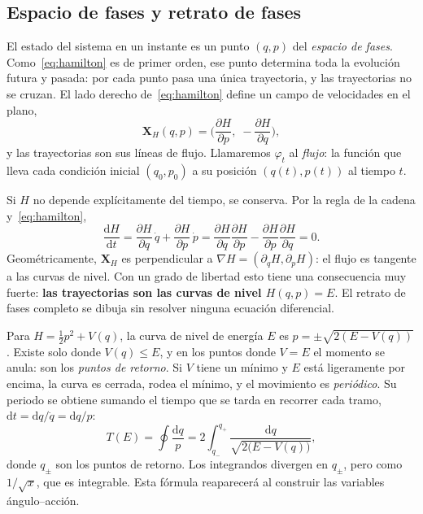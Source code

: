 \documentclass[11pt,a4paper]{article}
\newcommand{\dd}{\mathrm{d}}
\theoremstyle{definition}
\begin{document}
\subsection{Espacio de fases y retrato de fases}

El estado del sistema en un instante es un punto $(q,p)$ del \emph{espacio de
fases}. Como~\eqref{eq:hamilton} es de primer orden, ese punto determina toda la
evolución futura y pasada: por cada punto pasa una única trayectoria, y las
trayectorias no se cruzan. El lado derecho de~\eqref{eq:hamilton} define un campo de
velocidades en el plano,
\begin{equation}
  \mathbf{X}_H(q,p) = \Big(\frac{\partial H}{\partial p},\;
                         -\frac{\partial H}{\partial q}\Big),
\end{equation}
y las trayectorias son sus líneas de flujo. Llamaremos $\varphi_t$ al \emph{flujo}:
la función que lleva cada condición inicial $(q_0,p_0)$ a su posición
$(q(t),p(t))$ al tiempo $t$.

Si $H$ no depende explícitamente del tiempo, se conserva. Por la regla de la cadena
y~\eqref{eq:hamilton},
\begin{equation}
  \frac{\dd H}{\dd t}
  = \frac{\partial H}{\partial q}\,\dot q + \frac{\partial H}{\partial p}\,\dot p
  = \frac{\partial H}{\partial q}\frac{\partial H}{\partial p}
   -\frac{\partial H}{\partial p}\frac{\partial H}{\partial q} = 0 .
\end{equation}
Geométricamente, $\mathbf{X}_H$ es perpendicular a $\nabla H=(\partial_q H,\partial_p
H)$: el flujo es tangente a las curvas de nivel. Con un grado de libertad esto tiene
una consecuencia muy fuerte: \textbf{las trayectorias son las curvas de nivel
$H(q,p)=E$}. El retrato de fases completo se dibuja sin resolver ninguna ecuación
diferencial.

Para $H=\tfrac12p^2+V(q)$, la curva de nivel de energía $E$ es
$p=\pm\sqrt{2(E-V(q))}$. Existe solo donde $V(q)\le E$, y en los puntos donde $V=E$
el momento se anula: son los \emph{puntos de retorno}. Si $V$ tiene un mínimo y $E$
está ligeramente por encima, la curva es cerrada, rodea el mínimo, y el movimiento
es \emph{periódico}. Su periodo se obtiene sumando el tiempo que se tarda en recorrer
cada tramo, $\dd t=\dd q/\dot q=\dd q/p$:
\begin{equation}
  T(E) = \oint \frac{\dd q}{p}
       = 2\int_{q_-}^{q_+}\frac{\dd q}{\sqrt{2\big(E-V(q)\big)}} ,
  \label{eq:periodo}
\end{equation}
donde $q_\pm$ son los puntos de retorno. Los integrandos divergen en $q_\pm$, pero
como $1/\sqrt{x}$, que es integrable. Esta fórmula reaparecerá al construir las
variables ángulo--acción.
\end{document}

